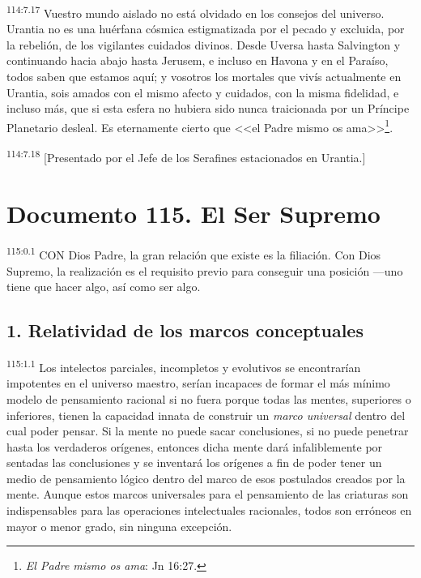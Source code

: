 \documentclass[twoside, 11pt]{book}
\begin{document}
\par
\textsuperscript{114:7.17} Vuestro mundo aislado no está olvidado en los consejos del universo. Urantia no es una huérfana cósmica estigmatizada por el pecado y excluida, por la rebelión, de los vigilantes cuidados divinos. Desde Uversa hasta Salvington y continuando hacia abajo hasta Jerusem, e incluso en Havona y en el Paraíso, todos saben que estamos aquí; y vosotros los mortales que vivís actualmente en Urantia, sois amados con el mismo afecto y cuidados, con la misma fidelidad, e incluso más, que si esta esfera no hubiera sido nunca traicionada por un Príncipe Planetario desleal. Es eternamente cierto que <<el Padre mismo os ama>>\footnote{\textit{El Padre mismo os ama}: Jn 16:27.}.

\par
\textsuperscript{114:7.18} [Presentado por el Jefe de los Serafines estacionados en Urantia.]


\chapter{Documento 115. El Ser Supremo}
\par
\textsuperscript{115:0.1} CON Dios Padre, la gran relación que existe es la filiación. Con Dios Supremo, la realización es el requisito previo para conseguir una posición ---uno tiene que hacer algo, así como ser algo.

\section*{1. Relatividad de los marcos conceptuales}
\par
\textsuperscript{115:1.1} Los intelectos parciales, incompletos y evolutivos se encontrarían impotentes en el universo maestro, serían incapaces de formar el más mínimo modelo de pensamiento racional si no fuera porque todas las mentes, superiores o inferiores, tienen la capacidad innata de construir un \textit{marco universal} dentro del cual poder pensar. Si la mente no puede sacar conclusiones, si no puede penetrar hasta los verdaderos orígenes, entonces dicha mente dará infaliblemente por sentadas las conclusiones y se inventará los orígenes a fin de poder tener un medio de pensamiento lógico dentro del marco de esos postulados creados por la mente. Aunque estos marcos universales para el pensamiento de las criaturas son indispensables para las operaciones intelectuales racionales, todos son erróneos en mayor o menor grado, sin ninguna excepción.
\end{document}
